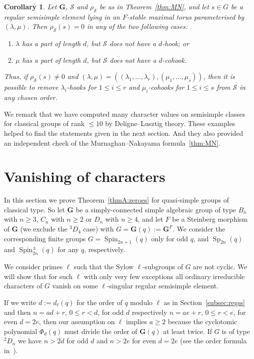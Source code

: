 \documentclass{ert-l}
\newcommand{\bG}{{\mathbf{G}}}
\newcommand{\cS}{{\mathcal{S}}}
\newcommand{\Sp}{{\operatorname{Sp}}}
\newcommand{\Spin}{{\operatorname{Spin}}}
\newcommand{\tw}[1]{{}^#1\!}
\let\la=\lambda
\newtheorem{cor}[thm]{Corollary}
\theoremstyle{definition}
\theoremstyle{remark}
\begin{document}
\begin{cor}   \label{cor:vanish}
 Let $\bG$, $\cS$ and $\rho_\cS$ be as in Theorem~\ref{thm:MN}, and
 let $s\in G$ be a regular semisimple element lying in an $F$-stable
 maximal torus parameterised by $(\la,\mu)$.
 Then $\rho_\cS(s)=0$ in any of the two following cases:
 \begin{enumerate}[\rm(1)]
  \item $\la$ has a part of length $d$, but $\cS$ does not have a $d$-hook; or
  \item $\mu$ has a part of length $d$, but $\cS$ does not have a $d$-cohook.
 \end{enumerate}
 Thus, if $\rho_\cS(s) \neq 0$ and $(\la,\mu) =
 ((\la_1, \ldots, \la_r),(\mu_1,\ldots,\mu_s))$, then it is possible to
 remove $\la_i$-hooks for $1\leq i \leq r$ and $\mu_i$-cohooks for
 $1\leq i \leq s$ from $\cS$ in any chosen order.
\end{cor}

We remark that we have computed many character values on semisimple classes
for classical groups of rank $\leq 10$ by Deligne--Lusztig theory. These
examples helped to find the statements given in the next section. And they
also provided an independent check of the Murnaghan--Nakayama
formula~\ref{thm:MN}.

\section{Vanishing of characters}   \label{sec:vanish}
In this section we prove Theorem~\ref{thmA:zeroes} for quasi-simple groups
of classical type. So let $\bG$ be a simply-connected simple algebraic group of
type $B_n$ with $n \geq 3$, $C_n$ with $n \geq 2$ or $D_n$ with $n \geq 4$,
and let $F$ be a Steinberg morphism of $\bG$ (we exclude the $\tw3D_4$ case)
with $G =\bG(q) := \bG^F$. We consider the corresponding finite groups
$G=\Spin_{2n+1}(q)$ only for odd $q$, and $\Sp_{2n}(q)$ and $\Spin^\pm_{2n}(q)$
for any $q$, respectively.

We consider primes $\ell$ such that the Sylow $\ell$-subgroups of $G$ are not
cyclic. We will show that for such $\ell$ with only very few exceptions all
ordinary irreducible characters of $G$ vanish on some $\ell$-singular regular
semisimple element.

If we write $d := d_\ell(q)$ for the order of $q$ modulo $\ell$ as in
Section~\ref{subsec:regss} and then $n = ad+r$, $0\leq r < d$, for odd $d$
respectively $n=ae+r$, $0\leq r < e$, for even $d=2e$, then our assumption on
$\ell$ implies $a\geq 2$ because the cyclotomic polynomial $\Phi_d(q)$ must
divide the order of $\bG(q)$ at least twice.
If $G$ is of type $\tw2D_n$ we have $n > 2d$ for odd $d$ and $n > 2e$ for even
$d=2e$ (see the order formula in~\cite[Tab.~24.1]{MT}).
\end{document}
